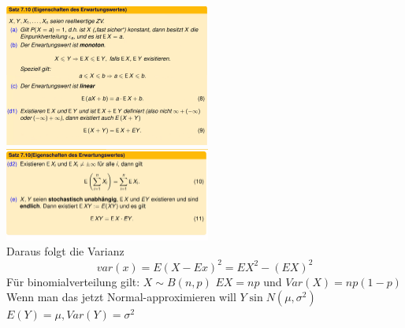 \documentclass{article}
\begin{document}
	\includegraphics[width=256px]{EigenschaftenvonErwartungswerten.png}\\
	\includegraphics[width=256px]{Eigenschaften2.png}\\
	Daraus folgt die Varianz
	\[var(x) = E(X-Ex)^2 = EX^2-(EX)^2\]
	Für binomialverteilung gilt: $X\sim B(n,p)$	$E X = np$ und $Var(X)=np(1-p)$ \\
	Wenn man das jetzt Normal-approximieren will $Y\sin N(\mu,\sigma^2)$ $E(Y)=\mu, Var(Y)=\sigma^2$
\end{document}
